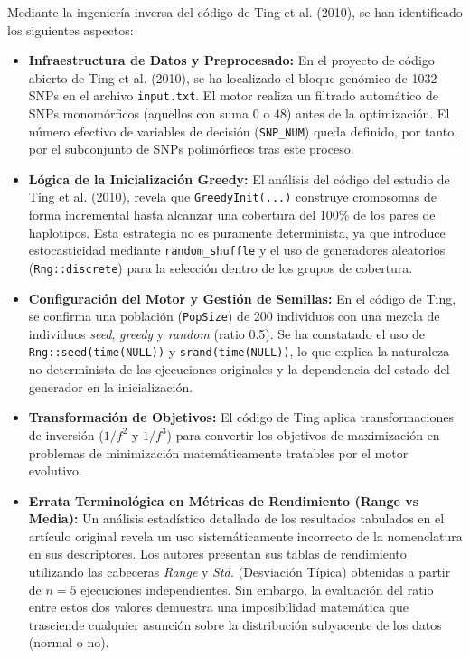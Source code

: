 \documentclass[a4paper,10pt]{article} %
\begin{document}
Mediante la ingeniería inversa del código de Ting et al. (2010), se han identificado los siguientes aspectos:

\begin{itemize}
    \item \textbf{Infraestructura de Datos y Preprocesado:} En el proyecto de código abierto de Ting et al. (2010), se ha localizado el bloque genómico de 1032 SNPs en el archivo \texttt{input.txt}. El motor realiza un filtrado automático de SNPs monomórficos (aquellos con suma 0 o 48) antes de la optimización. El número efectivo de variables de decisión (\texttt{SNP\_NUM}) queda definido, por tanto, por el subconjunto de SNPs polimórficos tras este proceso.
    \item \textbf{Lógica de la Inicialización Greedy:} El análisis del código del estudio de Ting et al. (2010), revela que \texttt{GreedyInit(...)} construye cromosomas de forma incremental hasta alcanzar una cobertura del 100\% de los pares de haplotipos. Esta estrategia no es puramente determinista, ya que introduce estocasticidad mediante \texttt{random\_shuffle} y el uso de generadores aleatorios (\texttt{Rng::discrete}) para la selección dentro de los grupos de cobertura.
    \item \textbf{Configuración del Motor y Gestión de Semillas:} En el código de Ting, se confirma una población (\texttt{PopSize}) de 200 individuos con una mezcla de individuos \textit{seed}, \textit{greedy} y \textit{random} (ratio 0.5). Se ha constatado el uso de \texttt{Rng::seed(time(NULL))} y \texttt{srand(time(NULL))}, lo que explica la naturaleza no determinista de las ejecuciones originales y la dependencia del estado del generador en la inicialización.
    \item \textbf{Transformación de Objetivos:} El código de Ting aplica transformaciones de inversión ($1/f^2$ y $1/f^3$) para convertir los objetivos de maximización en problemas de minimización matemáticamente tratables por el motor evolutivo.
    \item \textbf{Errata Terminológica en Métricas de Rendimiento (Range vs Media):} Un análisis estadístico detallado de los resultados tabulados en el artículo original revela un uso sistemáticamente incorrecto de la nomenclatura en sus descriptores. Los autores presentan sus tablas de rendimiento utilizando las cabeceras \textit{Range} y \textit{Std.} (Desviación Típica) obtenidas a partir de $n=5$ ejecuciones independientes. Sin embargo, la evaluación del ratio entre estos dos valores demuestra una imposibilidad matemática que trasciende cualquier asunción sobre la distribución subyacente de los datos (normal o no).
    

\end{itemize}
\end{document}
